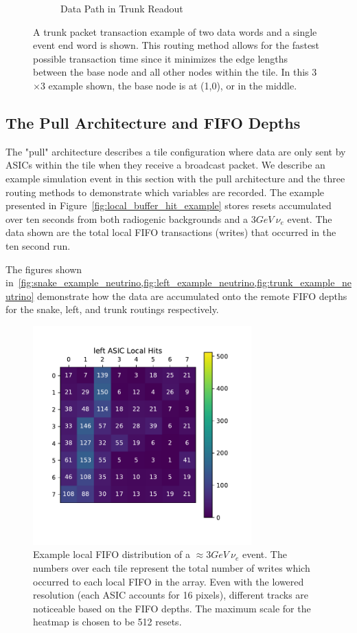 \begin{figure}
\begin{subfigure}{.5\textwidth}
  \caption{Data Path in Trunk Readout}
\end{subfigure}
\caption{A trunk packet transaction example of two data words and a single event end word is shown. 
This routing method allows for the fastest possible transaction time since it minimizes the edge lengths between the base node and all other nodes within the tile.
In this 3$\times$3 example shown, the base node is at (1,0), or in the middle.}
\label{fig:trunk_packet_drift}
\end{figure}


\subsection{The Pull Architecture and FIFO Depths}

The "pull" architecture describes a tile configuration where data are only sent by ASICs within the tile when they receive a broadcast packet.
We describe an example simulation event in this section with the pull architecture and the three routing methods to demonstrate which variables are recorded.
The example presented in Figure~\ref{fig:local_buffer_hit_example} stores resets accumulated over ten seconds from both radiogenic backgrounds and a 3$\unit{GeV}~\nu_{e}$ event.
The data shown are the total local FIFO transactions (writes) that occurred in the ten second run.

The figures shown in~\cref{fig:snake_example_neutrino,fig:left_example_neutrino,fig:trunk_example_neutrino} demonstrate how the data are accumulated onto the remote FIFO depths for the snake, left, and trunk routings respectively.

\begin{figure}[]
\centering
\includegraphics[width=0.75\textwidth]{images/left_asic_local.pdf}
\caption{Example local FIFO distribution of a $\approx 3\unit{GeV}~\nu_{e}$ event.
The numbers over each tile represent the total number of writes which occurred to each local FIFO in the array.
Even with the lowered resolution (each ASIC accounts for 16 pixels), different tracks are noticeable based on the FIFO depths.
The maximum scale for the heatmap is chosen to be 512 resets.
}
\end{figure}~\label{fig:local_buffer_hit_example}


